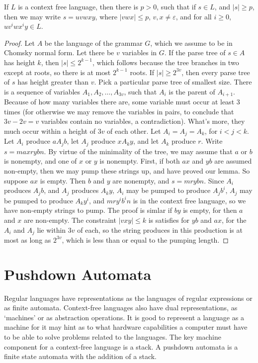 \begin{theorem}
    If $L$ is a context free language, then there is $p > 0$, such that if $s \in L$, and $|s| \geq p$, then we may write $s = uvwxy$, where $|vwx| \leq p$, $v,x \neq \varepsilon$, and for all $i \geq 0$, $uv^iwx^iy \in L$.
\end{theorem}
\begin{proof}
    Let $A$ be the language of the grammar $G$, which we assume to be in Chomsky normal form. Let there be $v$ variables in $G$. If the parse tree of $s \in A$ has height $k$, then $|s| \leq 2^{k-1}$, which follows because the tree branches in two except at roots, so there is at most $2^{k-1}$ roots. If $|s| \geq 2^{3v}$, then every parse tree of $s$ has height greater than $v$. Pick a particular parse tree of smallest size. There is a sequence of variables $A_1, A_2, \dots, A_{3v}$, such that $A_i$ is the parent of $A_{i+1}$. Because of how many variables there are, some variable must occur at least 3 times (for otherwise we may remove the variables in pairs, to conclude that $3v - 2v = v$ variables contain no variables, a contradiction). What's more, they much occur within a height of $3v$ of each other. Let $A_i = A_j = A_k$, for $i < j < k$. Let $A_i$ produce $a A_j b$, let $A_j$ produce $x A_k y$, and let $A_k$ produce $r$. Write $s = m a x r y b n$. By virtue of the minimality of the tree, we may assume that $a$ or $b$ is nonempty, and one of $x$ or $y$ is nonempty. First, if both $ax$ and $yb$ are assumed non-empty, then we may pump these strings up, and have proved our lemma. So suppose $ax$ is empty. Then $b$ and $y$ are nonempty, and $s = mrybn$. Since $A_i$ produces $A_j b$, and $A_j$ produces $A_k y$, $A_i$ may be pumped to produce $A_j b^i$, $A_j$ may be pumped to produce $A_k y^i$, and $mry^ib^in$ is in the context free language, so we have non-empty strings to pump. The proof is simlar if $by$ is empty, for then $a$ and $x$ are non-empty. The constraint $|vxy| \leq k$ is satisfies for $yb$ and $ax$, for the $A_i$ and $A_j$ lie within $3v$ of each, so the string produces in this production is at most as long as $2^{3v}$, which is less than or equal to the pumping length.
\end{proof}

\section{Pushdown Automata}

Regular languages have representations as the languages of regular expressions or as finite automata. Context-free languages also have dual representations, as `machines' or as abstraction operations. It is good to represent a language as a machine for it may hint as to what hardware capabilities a computer must have to be able to solve problems related to the languages. The key machine component for a context-free language is a stack. A pushdown automata is a finite state automata with the addition of a stack.

